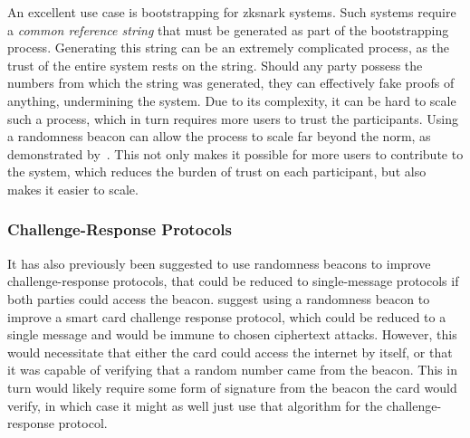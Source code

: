 An excellent use case is bootstrapping for \gls{zksnark} systems. Such systems require a \emph{common reference string} that must be generated as part of the bootstrapping process. Generating this string can be an extremely complicated process, as the trust of the entire system rests on the string. Should any party possess the numbers from which the string was generated, they can effectively fake proofs of anything, undermining the system. Due to its complexity, it can be hard to scale such a process, which in turn requires more users to trust the participants. Using a randomness beacon can allow the process to scale far beyond the norm, as demonstrated by~\citet{mpcsnarks}. This not only makes it possible for more users to contribute to the system, which reduces the burden of trust on each participant, but also makes it easier to scale.

\subsubsection{Challenge-Response Protocols}
It has also previously been suggested to use randomness beacons to improve challenge-response protocols, that could be reduced to single-message protocols if both parties could access the beacon.
\citet{fischer2011publicrandomnessservice} suggest using a randomness beacon to improve a smart card challenge response protocol, which could be reduced to a single message and would be immune to chosen ciphertext attacks. However, this would necessitate that either the card could access the internet by itself, or that it was capable of verifying that a random number came from the beacon. This in turn would likely require some form of signature from the beacon the card would verify, in which case it might as well just use that algorithm for the challenge-response protocol. %





